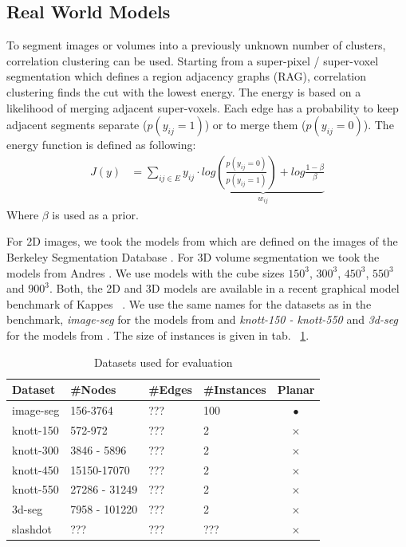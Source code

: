 \documentclass[10pt,twocolumn,letterpaper]{article}
\begin{document}
\subsection{Real World Models}
To segment images or volumes into a previously
unknown number of clusters, correlation clustering
can be used.
Starting from a super-pixel / super-voxel segmentation
which defines a region adjacency graphs (RAG),
correlation clustering finds the cut with the lowest energy.
The energy is based on a likelihood of merging adjacent super-voxels.
Each edge has a probability to keep adjacent segments separate ($p(y_{ij} =1)$)
or to merge them ($p(y_{ij} = 0)$).
The energy function is defined as following:
\begin{align}
 J(y)  &= \sum_{ij \in E} y_{ij}\cdot \underbrace{  log\left( \frac{p(y_{ij} =0)}{p(y_{ij} =1)}\right) + log \frac{1-\beta}{\beta}  }_{w_{ij}}
\end{align}
Where $\beta$ is used as a prior.

For 2D images, we took the models from \cite{andres_2011_iccv}
which are defined on the images of the Berkeley Segmentation
Database \cite{martin_2001}.
For 3D volume segmentation we took the models from
Andres \etal \cite{kroeger_2012_eccv}.
We use models with the cube sizes $150^3$, $300^3$, $450^3$, $550^3$ and $900^3$.
Both, the 2D and 3D models are available in a recent graphical model
benchmark of Kappes \etal ~\cite{kappes_2013_benchmark_cvpr}.
We use the same names for the datasets as in the benchmark,
\emph{image-seg} for the models from  \cite{andres_2011_iccv} and \emph{knott-150 - knott-550} and \emph{3d-seg}
for the models from \cite{kroeger_2012_eccv}.
The size of instances is given in tab. ~\ref{tab:instance_sizes}.


\begin{table}[H]
   \tiny
   \centering
   \caption{Datasets used for evaluation}
   \label{tab:instance_sizes}
   \begin{tabular}{llllc}
      \toprule
         Dataset          &     \#Nodes     & \#Edges  & \#Instances  & Planar        \\ 
      \midrule 
         image-seg        &     156-3764        & ???        & 100          & $\bullet$    \\ 
         knott-150        &     572-972         & ???        & 2            & $\times$ \\
         knott-300        &     3846 - 5896     & ???        & 2            & $\times$ \\
         knott-450        &     15150-17070     & ???        & 2            & $\times$ \\
         knott-550        &     27286 - 31249   & ???        & 2            & $\times$ \\
         3d-seg           &     7958 - 101220   & ???        & 2            & $\times$ \\
         slashdot         &     ???             & ???        & ???          & $\times$ \\     
      \bottomrule
   \end{tabular}
\end{table}
\end{document}
